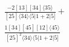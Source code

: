 \documentclass[varwidth, border=5pt]{standalone}
\begin{document}
\begin{my}
$\begin{gathered}
\scriptscriptstyle\frac{-2[13][34]⟨35⟩}{[25]⟨34⟩⟨5|1+2|5]}+\\
\scriptscriptstyle\frac{1[34][45][12]⟨45⟩}{[25]^2⟨34⟩⟨5|1+2|5]}\phantom{+}
\end{gathered}$
\end{my}
\end{document}
